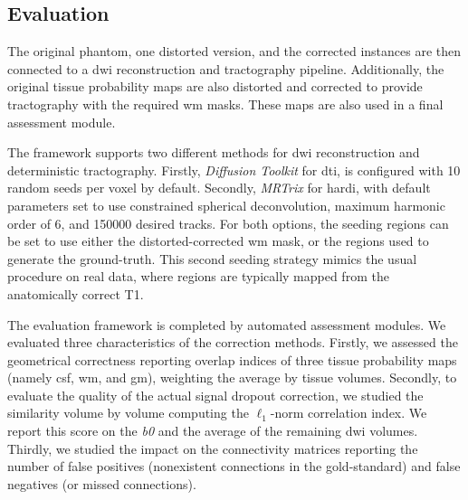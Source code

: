 \subsection{Evaluation}
\label{sec:evaluation}
The original phantom, one distorted version, and
the corrected instances are then connected to a
\gls*{dwi} reconstruction and tractography pipeline.
Additionally, the original tissue probability maps
are also distorted and corrected to provide tractography
with the required \gls*{wm} masks.
These maps are also used in a final assessment module.

The framework supports two different methods for
\gls*{dwi} reconstruction and deterministic tractography.
Firstly, \emph{Diffusion Toolkit} \cite{wang_diffusion_2007}
for \gls*{dti}, is configured with 10 random
seeds per voxel by default. Secondly, \emph{MRTrix}
\cite{tournier_mrtrix:_2012} for \gls*{hardi}, with
default parameters set to use constrained spherical
deconvolution, maximum harmonic order of 6, and 150000
desired tracks.
For both options, the seeding regions can be set to use
either the distorted-corrected \gls*{wm} mask, or the 
regions used to generate the ground-truth. This second
seeding strategy mimics the usual procedure on real 
data, where regions are typically mapped from the
anatomically correct T1.

The evaluation framework is completed by automated 
assessment modules. We evaluated three characteristics
of the correction methods. 
Firstly, we assessed the geometrical correctness
reporting overlap indices of three tissue
probability maps (namely \gls*{csf}, \gls*{wm},
and \gls*{gm}), weighting the average by tissue
volumes.
Secondly, to evaluate the quality of the actual 
signal dropout correction, we studied the 
similarity volume by volume computing the $\ell_1$-norm
correlation index. We report this score
on the \textit{b0} and the average of the remaining \gls*{dwi}
volumes. Thirdly, we studied the impact on the
connectivity matrices reporting the number of
false positives (nonexistent connections in the
gold-standard) and false negatives (or missed connections).